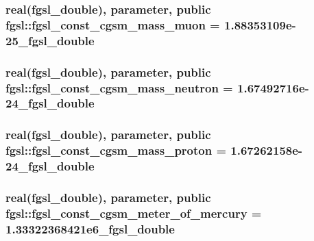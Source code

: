 \subsubsection[{fgsl\+\_\+const\+\_\+cgsm\+\_\+mass\+\_\+muon}]{\setlength{\rightskip}{0pt plus 5cm}real({\bf fgsl\+\_\+double}), parameter, public fgsl\+::fgsl\+\_\+const\+\_\+cgsm\+\_\+mass\+\_\+muon = 1.\+88353109e-\/25\+\_\+fgsl\+\_\+double}\label{namespacefgsl_a3092e1888259499b77e1dc358db86c58}
\hypertarget{namespacefgsl_aa4c1d627604e0ff04d68a92847dc1a00}{}
\subsubsection[{fgsl\+\_\+const\+\_\+cgsm\+\_\+mass\+\_\+neutron}]{\setlength{\rightskip}{0pt plus 5cm}real({\bf fgsl\+\_\+double}), parameter, public fgsl\+::fgsl\+\_\+const\+\_\+cgsm\+\_\+mass\+\_\+neutron = 1.\+67492716e-\/24\+\_\+fgsl\+\_\+double}\label{namespacefgsl_aa4c1d627604e0ff04d68a92847dc1a00}
\hypertarget{namespacefgsl_aefda043fac3adf36e5c9142193d24ef6}{}
\subsubsection[{fgsl\+\_\+const\+\_\+cgsm\+\_\+mass\+\_\+proton}]{\setlength{\rightskip}{0pt plus 5cm}real({\bf fgsl\+\_\+double}), parameter, public fgsl\+::fgsl\+\_\+const\+\_\+cgsm\+\_\+mass\+\_\+proton = 1.\+67262158e-\/24\+\_\+fgsl\+\_\+double}\label{namespacefgsl_aefda043fac3adf36e5c9142193d24ef6}
\hypertarget{namespacefgsl_aa8fef1711fbb6768c4d9f7061e85b117}{}
\subsubsection[{fgsl\+\_\+const\+\_\+cgsm\+\_\+meter\+\_\+of\+\_\+mercury}]{\setlength{\rightskip}{0pt plus 5cm}real({\bf fgsl\+\_\+double}), parameter, public fgsl\+::fgsl\+\_\+const\+\_\+cgsm\+\_\+meter\+\_\+of\+\_\+mercury = 1.\+33322368421e6\+\_\+fgsl\+\_\+double}\label{namespacefgsl_aa8fef1711fbb6768c4d9f7061e85b117}
\hypertarget{namespacefgsl_a6d4725a1ee32c2bf1dcd4aa1d2e00908}{}
